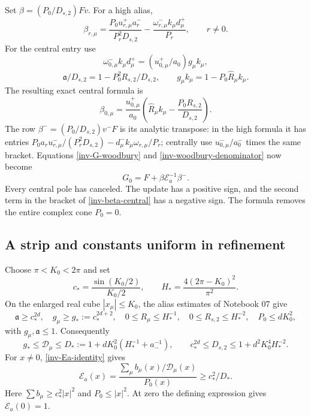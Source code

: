 \documentclass[11pt]{article}
\theoremstyle{remark}
\begin{document}
Set $\beta=(P_0/D_{s,2})Fv$. For a high alias,
\begin{equation}\label{inv-beta-high}
 \beta_{r,\mu}
 =\frac{P_0u_{r,\mu}^+a_r^-}{P_r^2D_{s,2}}
 -\frac{\omega_{r,\mu}^-k_\mu d_\mu^+}{P_r},
 \qquad r\ne0.
\end{equation}
For the central entry use
\[
 \omega_{0,\mu}^-k_\mu d_\mu^+
 =(u_{0,\mu}^+/a_0)g_\mu k_\mu,
\]
\[
 \mathfrak a/D_{s,2}=1-P_0^2R_{s,2}/D_{s,2},\qquad
 g_\mu k_\mu=1-P_0\widehat R_\mu k_\mu.
\]
The resulting exact central formula is
\begin{equation}\label{inv-beta-central}
 \beta_{0,\mu}=
 \frac{u_{0,\mu}^+}{a_0}
 \left(\widehat R_\mu k_\mu
                  -\frac{P_0R_{s,2}}{D_{s,2}}\right).
\end{equation}
The row $\beta^-=(P_0/D_{s,2})v^-F$ is its analytic transpose:
in the high formula it has entries
$P_0a_ru_{r,\mu}^-/(P_r^2D_{s,2})
-d_\mu^-k_\mu\omega_{r,\mu}/P_r$; centrally use
$u_{0,\mu}^-/a_0^-$ times the same bracket.
Equations \eqref{inv-G-woodbury} and
\eqref{inv-woodbury-denominator} now become
\begin{equation}\label{inv-final-formula}
 \boxed{\displaystyle G_0=F+\beta\mathcal E_a^{-1}\beta^-.}
\end{equation}
Every central pole has canceled. The update has a positive sign, and
the second term in the bracket of \eqref{inv-beta-central} has a
negative sign. The formula removes the entire complex cone $P_0=0$.

\subsection{A strip and constants uniform in refinement}

Choose $\pi<K_0<2\pi$ and set
\[
 c_* =\frac{\sin(K_0/2)}{K_0/2},\qquad
 H_* =\frac{4(2\pi-K_0)^2}{\pi^2}.
\]
On the enlarged real cube $|x_\mu|\le K_0$, the alias estimates of
Notebook 07 give
\[
 \mathfrak a\ge c_*^{2d},\quad
 g_\mu\ge g_*:=c_*^{2d+2},\quad
 0\le R_\mu\le H_*^{-1},\quad
 0\le R_{s,2}\le H_*^{-2},\quad P_0\le dK_0^2,
\]
with $g_\mu,\mathfrak a\le1$. Consequently
\[
 g_*\le\mathcal D_\mu\le
 D_*:=1+dK_0^2(H_*^{-1}+a_-^{-1}),\qquad
 c_*^{2d}\le D_{s,2}\le1+d^2K_0^4H_*^{-2}.
\]
For $x\ne0$, \eqref{inv-Ea-identity} gives
\begin{equation}\label{inv-Ea-lower}
 \mathcal E_a(x)=
 \frac{\sum_\mu b_\mu(x)/\mathcal D_\mu(x)}{P_0(x)}
 \ge c_*^2/D_*.
\end{equation}
Here $\sum b_\mu\ge c_*^2|x|^2$ and $P_0\le|x|^2$.
At zero the defining expression gives $\mathcal E_a(0)=1$.
\end{document}
